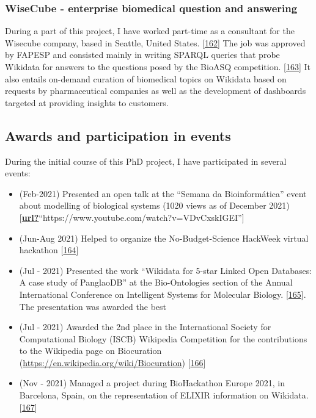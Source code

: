 \hypertarget{wisecube---enterprise-biomedical-question-and-answering}{%
\subsubsection{WiseCube - enterprise biomedical question and answering}\label{wisecube---enterprise-biomedical-question-and-answering}}

During a part of this project, I have worked part-time as a consultant for the Wisecube company, based in Seattle, United States. {[}\protect\hyperlink{ref-gdYsBE7d}{162}{]}
The job was approved by FAPESP and consisted mainly in writing SPARQL queries that probe Wikidata for answers to the questions posed by the BioASQ competition. {[}\protect\hyperlink{ref-rkXotO9x}{163}{]}
It also entails on-demand curation of biomedical topics on Wikidata based on requests by pharmaceutical companies as well as the development of dashboards targeted at providing insights to customers.

\hypertarget{awards-and-participation-in-events}{%
\subsection{Awards and participation in events}\label{awards-and-participation-in-events}}

During the initial course of this PhD project, I have participated in several events:

\begin{itemize}
\tightlist
\item
  (Feb-2021) Presented an open talk at the ``Semana da Bioinformática'' event about modelling of biological systems (1020 views as of December 2021) {[}\protect\hyperlink{ref-url}{\textbf{url?}}``https://www.youtube.com/watch?v=VDvCxskIGEI''{]}
\item
  (Jun-Aug 2021) Helped to organize the No-Budget-Science HackWeek virtual hackathon {[}\protect\hyperlink{ref-12LOzmXRs}{164}{]}
\item
  (Jul - 2021) Presented the work ``Wikidata for 5-star Linked Open Databases: A case study of PanglaoDB'' at the Bio-Ontologies section of the Annual International Conference on Intelligent Systems for Molecular Biology. {[}\protect\hyperlink{ref-SALI6Ywb}{165}{]}. The presentation was awarded the best
\item
  (Jul - 2021) Awarded the 2nd place in the International Society for Computational Biology (ISCB) Wikipedia Competition for the contributions to the Wikipedia page on Biocuration (\url{https://en.wikipedia.org/wiki/Biocuration}) {[}\protect\hyperlink{ref-IJG65hFm}{166}{]}
\item
  (Nov - 2021) Managed a project during BioHackathon Europe 2021, in Barcelona, Spain, on the representation of ELIXIR information on Wikidata. {[}\protect\hyperlink{ref-14Wi842eZ}{167}{]}
\end{itemize}


